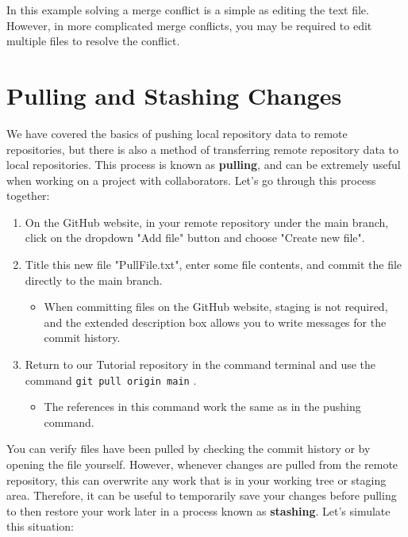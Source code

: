 \documentclass[10pt]{article}
\begin{document}
In this example solving a merge conflict is a simple as editing the text file. However, in more complicated merge conflicts, you may be required to edit multiple files to resolve the conflict. 

\section{Pulling and Stashing Changes}

We have covered the basics of pushing local repository data to remote repositories, but there is also a method of transferring remote repository data to local repositories. This process is known as \textbf{pulling}, and can be extremely useful when working on a project with collaborators. Let's go through this process together:

\begin{enumerate}
\item On the GitHub website, in your remote repository under the main branch, click on the dropdown "Add file" button and choose "Create new file".
\item Title this new file "PullFile.txt", enter some file contents, and commit the file directly to the main branch.
	\begin{itemize}
	\item When committing files on the GitHub website, staging is not required, and the extended description box allows you to write messages for the commit history.
	\end{itemize}
\item Return to our Tutorial repository in the command terminal and use the command \texttt{git pull origin main} .
	\begin{itemize}
	\item The references in this command work the same as in the pushing command. 
	\end{itemize}
\end{enumerate}

You can verify files have been pulled by checking the commit history or by opening the file yourself. However, whenever changes are pulled from the remote repository, this can overwrite any work that is in your working tree or staging area. Therefore, it can be useful to temporarily save your changes before pulling to then restore your work later in a process known as \textbf{stashing}. Let's simulate this situation:
\end{document}
